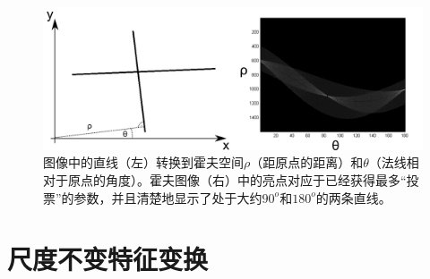 \begin{figure}
\center
\includegraphics[width=\textwidth]{figs/houghtransform}
\caption{
图像中的直线（左）转换到霍夫空间$\rho$（距原点的距离）和$\theta$（法线相对于原点的角度）。霍夫图像（右）中的亮点对应于已经获得最多“投票”的参数，并且清楚地显示了处于大约$90^o$和$180^o$的两条直线。
\label{fig:hough}} 
\end{figure}



\section{尺度不变特征变换}

